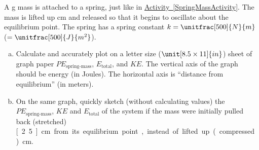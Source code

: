 \label{fnt2.3.1-2}

A \unit[200]{g} mass is attached to a spring, just like in \hyperref[SpringMassActivity]{Activity~\ref{SpringMassActivity}}. The mass is lifted up \unit[5]{cm} and released so that it begins to oscillate about the equilibrium point. The spring has a spring constant $k = \unitfrac[500]{N}{m}$ ($= \unitfrac[500]{J}{m^2}$).

\begin{enumerate}[(a)]
	\item Calculate and accurately plot on a letter size ($\unit[8.5 \times 11]{in}$) sheet of graph paper $PE_\text{spring-mass}$, $E_\text{total}$, and $KE$. The vertical axis of the graph should be energy (in Joules). The horizontal axis is ``distance from equilibrium'' (in meters). 

	\item On the same graph, quickly sketch (without calculating values) the $PE_\text{spring-mass}$, $KE$ and $E_\text{total}$ of the system if the mass were initially pulled back (stretched) \unit[2.5]{cm} from its equilibrium point, instead of lifted up (compressed) \unit[5]{cm}.
\end{enumerate}